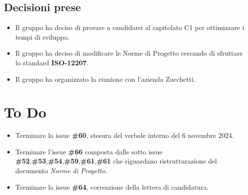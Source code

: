 \documentclass[a4paper, 12pt]{article}
\begin{document}
\subsection{Decisioni prese}
\begin{itemize}
    \item Il gruppo ha deciso di provare a candidarsi al capitolato C1 per ottimizzare i tempi di sviluppo.
    \item Il gruppo ha deciso di modificare le Norme di Progetto cercando di sfruttare lo standard \textbf{ISO-12207}.
    \item Il gruppo ha organizzato la riunione con l'azienda Zucchetti.
\end{itemize}
\section{To Do}
\begin{itemize}
\item Terminare la issue \textbf{\#60}, stesura del verbale interno del 6 novembre 2024.
\item Terminare l'issue \textbf{\#66} composta dalle sotto issue \textbf{\#52},\textbf{\#53},\textbf{\#54},\textbf{\#59},\textbf{\#61},\textbf{\#61} che riguardano
ristrutturazione del documento \textit{Norme di Progetto}.
\item Terminare la issue \textbf{\#64}, correzzione della lettera di candidatura.
\end{itemize}
\end{document}
